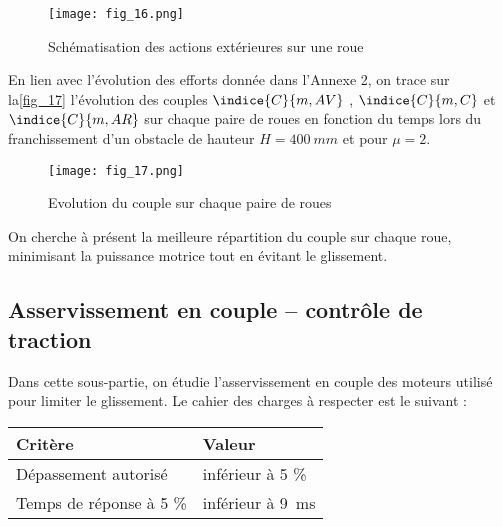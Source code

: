 \begin{figure}[H]
\centering
\texttt{[image: fig\_16.png]}
\caption{Schématisation des actions extérieures sur une roue\label{fig_16}}
\end{figure}


En lien avec l'évolution des efforts donnée dans l'Annexe 2, on trace sur la\autoref{fig_17} l'évolution
des couples $\indice{C}{m, AV}$ , $\indice{C}{m,C}$ et $\indice{C}{m,AR}$ sur chaque paire de roues en fonction du temps lors du franchissement d'un obstacle de hauteur $H =\SI{400}{mm}$ et pour $\mu=2$.

\begin{figure}[H]
\centering
\texttt{[image: fig\_17.png]}
\caption{Evolution du couple sur chaque paire de roues\label{fig_17}}
\end{figure}



On cherche à présent la meilleure répartition du couple sur chaque roue, minimisant la puissance
motrice tout en évitant le glissement.



\subsection{Asservissement en couple – contrôle de traction}

\begin{obj}
Dans cette sous-partie, on étudie l’asservissement en couple des moteurs utilisé pour
limiter le glissement. Le cahier des charges à respecter est le suivant :

\begin{center}
\begin{tabular}{ll}
\hline
\textbf{Critère} & \textbf{Valeur} \\ \hline \hline
Dépassement autorisé & inférieur à 5 \% \\ \hline
Temps de réponse à 5 \% & inférieur à \SI{9}{ms} \\ \hline
\end{tabular}
\end{center}

\end{obj}


